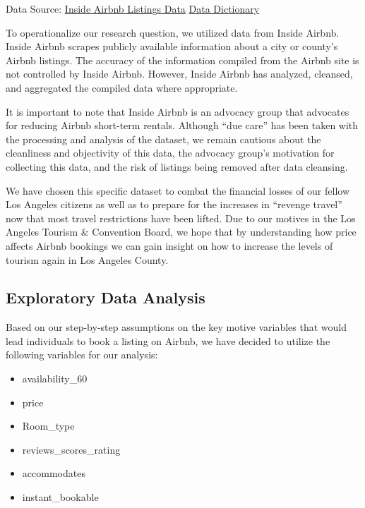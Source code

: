 \documentclass[
]{article}
\begin{document}
Data Source: \href{http://insideairbnb.com/get-the-data.html}{Inside Airbnb Listings Data}
\href{https://docs.google.com/spreadsheets/d/1iWCNJcSutYqpULSQHlNyGInUvHg2BoUGoNRIGa6Szc4/edit\#gid=0}{Data Dictionary}

To operationalize our research question, we utilized data from Inside Airbnb. Inside Airbnb scrapes publicly available information about a city or county's Airbnb listings. The accuracy of the information compiled from the Airbnb site is not controlled by Inside Airbnb. However, Inside Airbnb has analyzed, cleansed, and aggregated the compiled data where appropriate.

It is important to note that Inside Airbnb is an advocacy group that advocates for reducing Airbnb short-term rentals. Although ``due care'' has been taken with the processing and analysis of the dataset, we remain cautious about the cleanliness and objectivity of this data, the advocacy group's motivation for collecting this data, and the risk of listings being removed after data cleansing.

We have chosen this specific dataset to combat the financial losses of our fellow Los Angeles citizens as well as to prepare for the increases in ``revenge travel'' now that most travel restrictions have been lifted. Due to our motives in the Los Angeles Tourism \& Convention Board, we hope that by understanding how price affects Airbnb bookings we can gain insight on how to increase the levels of tourism again in Los Angeles County.

\hypertarget{exploratory-data-analysis}{%
\subsection{Exploratory Data Analysis}\label{exploratory-data-analysis}}

Based on our step-by-step assumptions on the key motive variables that would lead individuals to book a listing on Airbnb, we have decided to utilize the following variables for our analysis:

\begin{itemize}
\item
  availability\_60
\item
  price
\item
  Room\_type
\item
  reviews\_scores\_rating
\item
  accommodates
\item
  instant\_bookable
\end{itemize}
\end{document}
